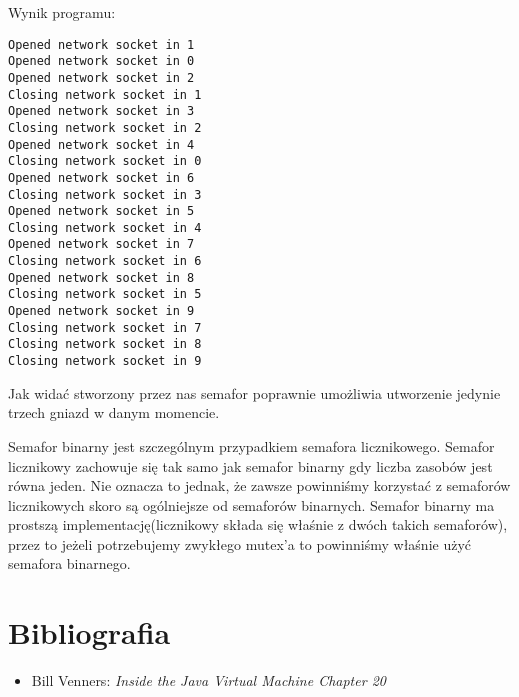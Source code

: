 \documentclass[11pt]{article}
\begin{document}
Wynik programu:
\begin{tcolorbox}
\begin{Verbatim}
Opened network socket in 1
Opened network socket in 0
Opened network socket in 2
Closing network socket in 1
Opened network socket in 3
Closing network socket in 2
Opened network socket in 4
Closing network socket in 0
Opened network socket in 6
Closing network socket in 3
Opened network socket in 5
Closing network socket in 4
Opened network socket in 7
Closing network socket in 6
Opened network socket in 8
Closing network socket in 5
Opened network socket in 9
Closing network socket in 7
Closing network socket in 8
Closing network socket in 9
\end{Verbatim}


\end{tcolorbox}Jak widać stworzony przez nas semafor poprawnie umożliwia utworzenie jedynie trzech gniazd w
danym momencie.

Semafor binarny jest szczególnym przypadkiem semafora licznikowego. Semafor
licznikowy zachowuje się tak samo jak semafor binarny gdy liczba zasobów jest
równa jeden. Nie oznacza to jednak, że zawsze powinniśmy korzystać z semaforów
licznikowych skoro są ogólniejsze od semaforów binarnych. Semafor binarny
ma prostszą implementację(licznikowy składa się właśnie z dwóch takich semaforów),
przez to jeżeli potrzebujemy zwykłego mutex'a to powinniśmy właśnie użyć semafora binarnego.
\section*{Bibliografia}
\label{sec:org7dbccd1}
\begin{itemize}
\item Bill Venners: \emph{Inside the Java Virtual Machine Chapter 20}
\end{itemize}
\end{document}
